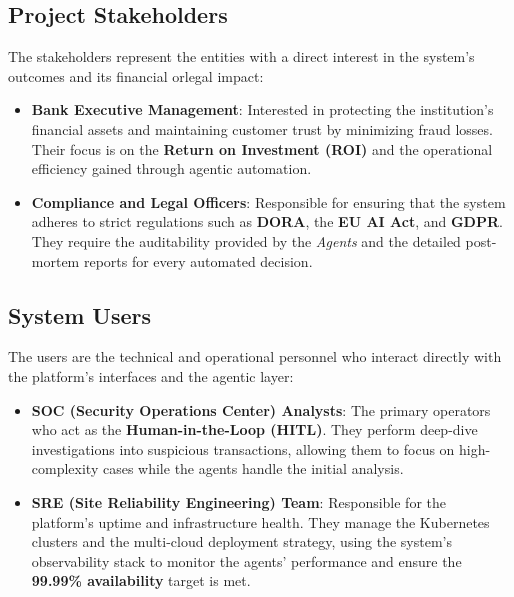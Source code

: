 \documentclass[12pt]{report}
\begin{document}
\subsection{Project Stakeholders}
The stakeholders represent the entities with a direct interest in the system's outcomes and its financial orlegal impact:
\begin{itemize}
    \item \textbf{Bank Executive Management}: Interested in protecting the institution's financial assets and maintaining customer trust by minimizing fraud losses. Their focus is on the \textbf{Return on Investment (ROI)} and the operational efficiency gained through agentic automation.
    \item \textbf{Compliance and Legal Officers}: Responsible for ensuring that the system adheres to strict regulations such as \textbf{DORA}, the \textbf{EU AI Act}, and \textbf{GDPR}. They require the auditability provided by the \textit{Agents} and the detailed post-mortem reports for every automated decision.
\end{itemize}

\subsection{System Users}
The users are the technical and operational personnel who interact directly with the platform's interfaces and the agentic layer:
\begin{itemize}
    \item \textbf{SOC (Security Operations Center) Analysts}: The primary operators who act as the \textbf{Human-in-the-Loop (HITL)}. They perform deep-dive investigations into suspicious transactions, allowing them to focus on high-complexity cases while the agents handle the initial analysis.
    \item \textbf{SRE (Site Reliability Engineering) Team}: Responsible for the platform's uptime and infrastructure health. They manage the Kubernetes clusters and the multi-cloud deployment strategy, using the system's observability stack to monitor the agents' performance and ensure the \textbf{99.99\% availability} target is met.
\end{itemize}
\end{document}
